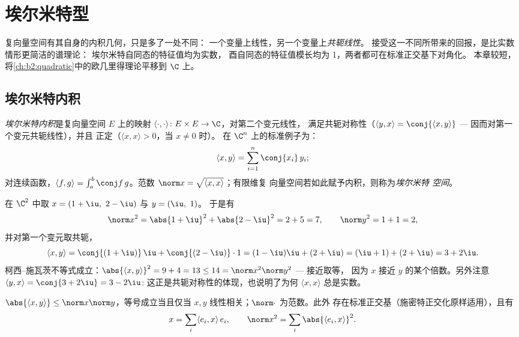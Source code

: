 \chapter{埃尔米特型}\label{ch:b2:hermitian}

复向量空间有其自身的内积几何，只是多了一处不同：
一个变量上线性，另一个变量上\emph{共轭线性}。
接受这一不同所带来的回报，是比实数情形更简洁的谱理论：
埃尔米特自同态的特征值均为实数，
酉自同态的特征值模长均为 1，两者都可在标准正交基下对角化。
本章较短，
将\cref{ch:b2:quadratic}中的欧几里得理论平移到 $\C$ 上。

\section{埃尔米特内积}

\begin{definition}\label{def:b2:hermitian:def}
\emph{埃尔米特内积}是复向量空间
$E$ 上的映射 $\langle\cdot,\cdot\rangle
\colon E \times E \to \C$，对第二个变元线性，
满足共轭对称性（$\langle y, x\rangle = \conj{\langle x,
y\rangle}$ --- 因而对第一个变元共轭线性），并且
正定（$\langle x, x\rangle > 0$，当 $x \neq 0$ 时）。
在 $\C^n$ 上的标准例子为：
\[
\langle x, y \rangle = \sum_{i=1}^{n} \conj{x_i}\, y_i ;
\]
对连续函数，$\langle f, g\rangle = \int_a^b \conj
f\,g$。范数 $\norm x = \sqrt{\langle x,x\rangle}$；有限维复
向量空间若如此赋予内积，则称为\emph{埃尔米特
空间}。
\end{definition}

\begin{example}[初步计算]\label{ex:b2:hermitian:firstcomp}
在 $\C^2$ 中取 $x = (1+\iu,\ 2-\iu)$ 与 $y = (\iu,\ 1)$。
于是有
\[
\norm x^2 = \abs{1+\iu}^2 + \abs{2-\iu}^2 = 2 + 5 = 7,
\qquad
\norm y^2 = 1 + 1 = 2,
\]
并对第一个变元取共轭，
\[
\langle x, y\rangle
= \conj{(1+\iu)}\,\iu + \conj{(2-\iu)}\cdot1
= (1-\iu)\iu + (2+\iu)
= (\iu + 1) + (2 + \iu) = 3 + 2\iu .
\]
柯西–施瓦茨不等式成立：$\abs{\langle x, y\rangle}^2 = 9 +
4 = 13 \leq 14 = \norm x^2\norm y^2$ --- 接近取等，
因为 $x$ 接近 $y$ 的某个倍数。另外注意
$\langle y, x\rangle = \conj{3 + 2\iu} = 3 - 2\iu$:
这正是共轭对称性的体现，也说明了为何 $\langle x,
x\rangle$ 总是实数。
\end{example}

\begin{theorem}\label{thm:b2:hermitian:cs}
$\abs{\langle x, y\rangle} \leq \norm x \norm y$，等号成立当且仅当
$x, y$ 线性相关；$\norm\cdot$ 为范数。此外
存在标准正交基（施密特正交化原样适用），且有
\[
x = \sum_i \langle e_i, x\rangle\, e_i,
\qquad
\norm x^2 = \sum_i \abs{\langle e_i, x\rangle}^2 .
\]
\end{theorem}

